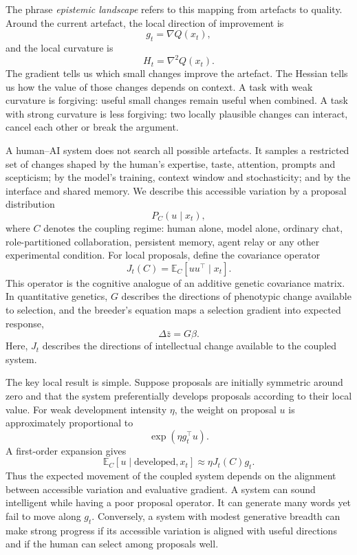 \documentclass[11pt]{article}
\newcommand{\E}{\mathbb{E}}
\begin{document}
The phrase \emph{epistemic landscape} refers to this mapping from artefacts to quality. Around the current artefact, the local direction of improvement is
\begin{equation}
    g_t = \nabla Q(x_t),
\end{equation}
and the local curvature is
\begin{equation}
    H_t = \nabla^2 Q(x_t).
\end{equation}
The gradient tells us which small changes improve the artefact. The Hessian tells us how the value of those changes depends on context. A task with weak curvature is forgiving: useful small changes remain useful when combined. A task with strong curvature is less forgiving: two locally plausible changes can interact, cancel each other or break the argument.

A human--AI system does not search all possible artefacts. It samples a restricted set of changes shaped by the human's expertise, taste, attention, prompts and scepticism; by the model's training, context window and stochasticity; and by the interface and shared memory. We describe this accessible variation by a proposal distribution
\begin{equation}
    P_C(u \mid x_t),
\end{equation}
where $C$ denotes the coupling regime: human alone, model alone, ordinary chat, role-partitioned collaboration, persistent memory, agent relay or any other experimental condition. For local proposals, define the covariance operator
\begin{equation}
    J_t(C) = \E_C[u u^\top \mid x_t].
\end{equation}
This operator is the cognitive analogue of an additive genetic covariance matrix. In quantitative genetics, $G$ describes the directions of phenotypic change available to selection, and the breeder's equation maps a selection gradient into expected response,
\begin{equation}
    \Delta \bar z = G\beta.
\end{equation}
Here, $J_t$ describes the directions of intellectual change available to the coupled system.

The key local result is simple. Suppose proposals are initially symmetric around zero and that the system preferentially develops proposals according to their local value. For weak development intensity $\eta$, the weight on proposal $u$ is approximately proportional to
\begin{equation}
    \exp(\eta g_t^\top u).
\end{equation}
A first-order expansion gives
\begin{equation}
    \E_C[u \mid \text{developed},x_t] \approx \eta J_t(C) g_t. \label{eq:response}
\end{equation}
Thus the expected movement of the coupled system depends on the alignment between accessible variation and evaluative gradient. A system can sound intelligent while having a poor proposal operator. It can generate many words yet fail to move along $g_t$. Conversely, a system with modest generative breadth can make strong progress if its accessible variation is aligned with useful directions and if the human can select among proposals well.
\end{document}
